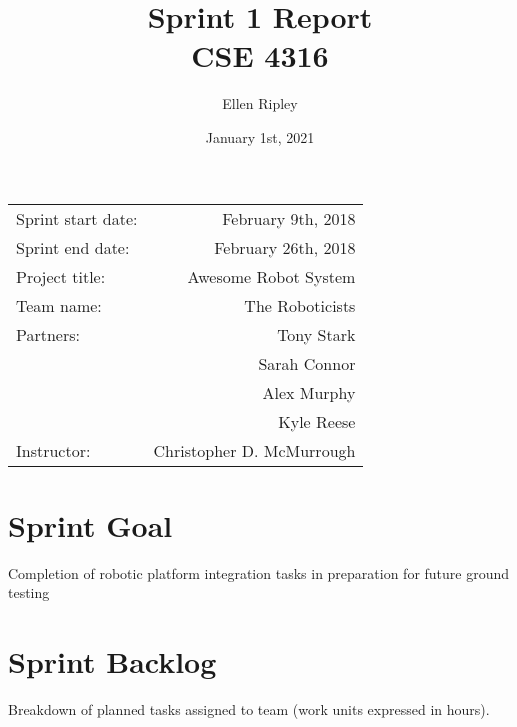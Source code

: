 \documentclass{article}
\title{Sprint 1 Report \\ CSE 4316}
\author{Ellen Ripley}
\date{January 1st, 2021}
\begin{document}
\maketitle
\begin{center}
\begin{tabular}{l r}

Sprint start date: & February 9th, 2018 \\

Sprint end date: & February 26th, 2018 \\

Project title: & Awesome Robot System \\

Team name: & The Roboticists \\

Partners: 	& Tony Stark \\
			& Sarah Connor \\
			& Alex Murphy \\
        	& Kyle Reese \\
Instructor: & Christopher D. McMurrough
\end{tabular}
\end{center}

\section{Sprint Goal}
Completion of robotic platform integration tasks in preparation for future ground testing

\section{Sprint Backlog}
Breakdown of planned tasks assigned to team (work units expressed in hours). \\ %
\end{document}
